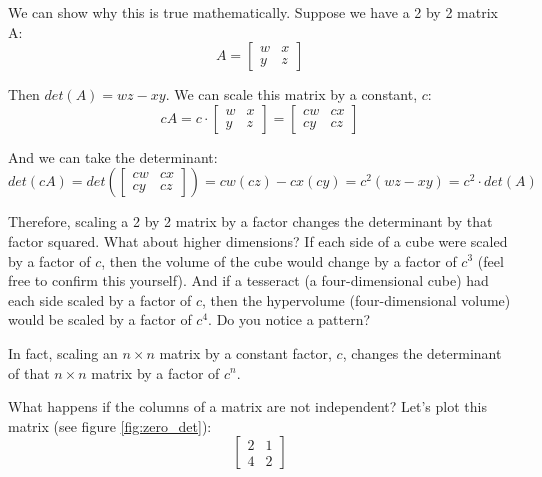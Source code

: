 We can show why this is true mathematically. Suppose we have a 2 by 2 matrix A:
$$A = \begin{bmatrix}
w & x\\
y & z
\end{bmatrix}$$

Then $det(A) = wz - xy$. We can scale this matrix by a constant, $c$:
$$cA = c \cdot \begin{bmatrix}
w & x\\
y & z
\end{bmatrix} = \begin{bmatrix}
cw & cx\\
cy & cz
\end{bmatrix}$$

And we can take the determinant:
$$det(cA) = det \left( \begin{bmatrix}
cw & cx\\
cy & cz
\end{bmatrix} \right)= cw(cz) - cx(cy) = c^2 (wz - xy) = c^2 \cdot det(A)$$

Therefore, scaling a 2 by 2 matrix by a factor changes the determinant by that 
factor squared. What about higher dimensions? If each side of a cube were 
scaled by a factor of $c$, then the volume of the cube would change by a 
factor of $c^3$ (feel free to confirm this yourself). And if a tesseract (a 
four-dimensional cube) had each side scaled by a factor of $c$, then the 
hypervolume (four-dimensional volume) would be scaled by a factor of $c^4$. Do 
you notice a pattern?

In fact, scaling an $n \times n$ matrix by a constant factor, $c$, changes the 
determinant of that $n \times n$ matrix by a factor of $c^n$. 

What happens if the columns of a matrix are not independent? Let's plot this 
matrix (see figure \ref{fig:zero_det}):
$$
\begin{bmatrix}
2 & 1  \\
4 & 2 
\end{bmatrix}
$$

